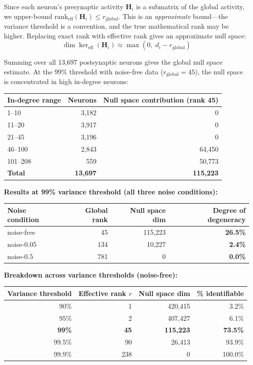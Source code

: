 \documentclass[11pt,a4paper]{article}
\begin{document}
Since each neuron's presynaptic activity $\mathbf{H}_i$ is a submatrix of the global activity, we upper-bound $\text{rank}_{\text{eff}}(\mathbf{H}_i) \leq r_{\text{global}}$. This is an \emph{approximate} bound---the variance threshold is a convention, and the true mathematical rank may be higher. Replacing exact rank with effective rank gives an approximate null space:
\begin{equation}
\dim\ker_{\text{eff}}(\mathbf{H}_i) \approx \max(0, \; d_i - r_{\text{global}})
\end{equation}

Summing over all 13,697 postsynaptic neurons gives the global null space estimate. At the 99\% threshold with noise-free data ($r_{\text{global}} = 45$), the null space is concentrated in high in-degree neurons:

\begin{center}
\begin{tabular}{lrr}
\toprule
In-degree range & Neurons & Null space contribution (rank 45) \\
\midrule
1--10   & 3,182 & 0 \\
11--20  & 3,917 & 0 \\
21--45  & 3,196 & 0 \\
46--100 & 2,843 & 64,450 \\
101--208 & 559  & 50,773 \\
\midrule
\textbf{Total} & \textbf{13,697} & \textbf{115,223} \\
\bottomrule
\end{tabular}
\end{center}

\noindent\textbf{Results at 99\% variance threshold (all three noise conditions):}

\begin{center}
\begin{tabular}{lrrr}
\toprule
Noise condition & Global rank & Null space dim & \textbf{Degree of degeneracy} \\
\midrule
noise-free & 45 & 115,223 & \textbf{26.5\%} \\
noise-0.05 & 134 & 10,227 & \textbf{2.4\%} \\
noise-0.5 & 781 & 0 & \textbf{0.0\%} \\
\bottomrule
\end{tabular}
\end{center}

\noindent\textbf{Breakdown across variance thresholds (noise-free):}

\begin{center}
\begin{tabular}{rrrr}
\toprule
Variance threshold & Effective rank $r$ & Null space dim & \% identifiable \\
\midrule
90\%  & 1 & 420,415 & 3.2\% \\
95\%  & 2 & 407,427 & 6.1\% \\
\textbf{99\%}  & \textbf{45}  & \textbf{115,223} & \textbf{73.5\%} \\
99.5\% & 90 & 26,413 & 93.9\% \\
99.9\% & 238 & 0 & 100.0\% \\
\bottomrule
\end{tabular}
\end{center}
\end{document}
